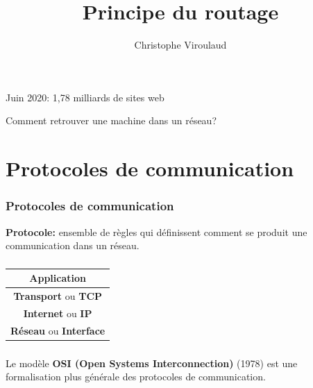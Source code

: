 \documentclass[svgnames,11pt]{beamer}
\author[]{Christophe Viroulaud}
\title{Principe du routage}
\date{\framebox{\textbf{Archi 10}}}
\institute{Terminale - NSI}
\begin{document}
\begin{frame}
    \titlepage
\end{frame}

\begin{frame}
    \frametitle{}


    \begin{center}
        Juin 2020: 1,78 milliards de sites web
    \end{center}
    \begin{framed}
        \centering Comment retrouver une machine dans un réseau?
    \end{framed}
\end{frame}
\section{Protocoles de communication}
\begin{frame}
    \frametitle{Protocoles de communication}


    \begin{aretenir}[]
        \textbf{Protocole:} ensemble de règles qui définissent comment se produit une communication dans un réseau.
    \end{aretenir}

\end{frame}
\begin{frame}
    \frametitle{}

    \begin{center}
        \renewcommand{\arraystretch}{1.5}
        \begin{tabular}{|c|}
            \hline
            \textbf{Application}                  \\
            \hline
            \textbf{Transport} ou \textbf{TCP}    \\
            \hline
            \textbf{Internet} ou \textbf{IP}      \\
            \hline
            \textbf{Réseau} ou \textbf{Interface} \\
            \hline
        \end{tabular}
        \renewcommand{\arraystretch}{1}
    \end{center}
\end{frame}
\begin{frame}
    \frametitle{}

    \begin{aretenir}[Remarque]
        Le modèle \textbf{OSI (Open Systems Interconnection)} (1978) est une formalisation plus générale des protocoles de communication.
    \end{aretenir}

\end{frame}
\end{document}
